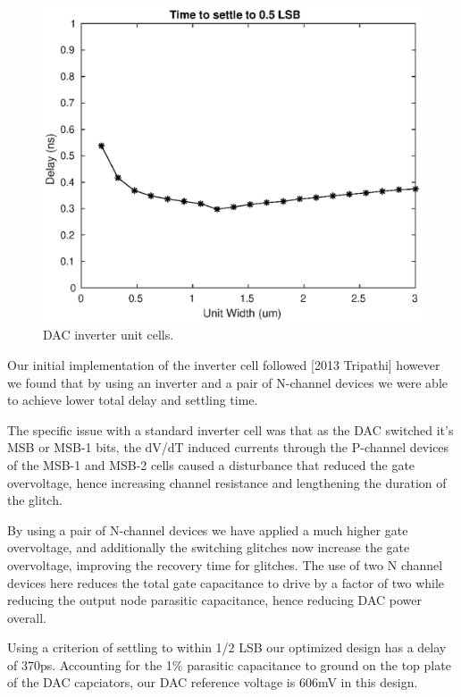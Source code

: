 \documentclass[10pt,journal]{IEEEtran}\usepackage{longtable}
\begin{document}
\begin{figure}[tbph]
\begin{center}
\includegraphics[width=1\columnwidth]{dac_optimization.eps}
\caption{DAC inverter unit cells.}
\label{fig:DACUnitInverterSch}
\end{center}
\end{figure}

Our initial implementation of the inverter cell followed [2013 Tripathi] however we found that by using an inverter and a pair of N-channel devices we were able to achieve lower total delay and settling time. 

The specific issue with a standard inverter cell was that as the DAC switched it's MSB or MSB-1 bits, the dV/dT induced currents through the P-channel devices of the MSB-1 and MSB-2 cells caused a disturbance that reduced the gate overvoltage, hence increasing channel resistance and lengthening the duration of the glitch. 

By using a pair of N-channel devices we have applied a much higher gate overvoltage, and additionally the switching glitches now increase the gate overvoltage, improving the recovery time for glitches.
The use of two N channel devices here reduces the total gate capacitance to drive by a factor of two while reducing the output node parasitic capacitance, hence reducing DAC power overall.

Using a criterion of settling to within 1/2 LSB our optimized design has a delay of 370ps.
Accounting for the 1\% parasitic capacitance to ground on the top plate of the DAC capciators, our DAC reference voltage is 606mV in this design. 
\end{document}
